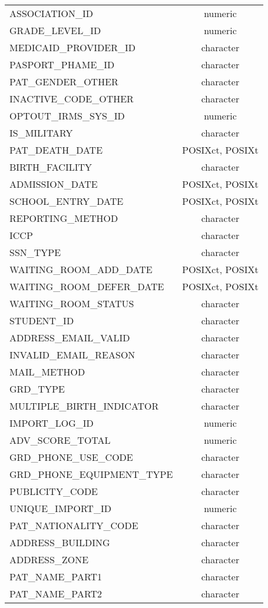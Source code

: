 \documentclass[
  letterpaper,
  DIV=11,
  numbers=noendperiod]{scrreprt}
\begin{document}
\begin{longtable}{lc}
ASSOCIATION\_ID & numeric \\ 
GRADE\_LEVEL\_ID & numeric \\ 
MEDICAID\_PROVIDER\_ID & character \\ 
PASPORT\_PHAME\_ID & character \\ 
PAT\_GENDER\_OTHER & character \\ 
INACTIVE\_CODE\_OTHER & character \\ 
OPTOUT\_IRMS\_SYS\_ID & numeric \\ 
IS\_MILITARY & character \\ 
PAT\_DEATH\_DATE & POSIXct, POSIXt \\ 
BIRTH\_FACILITY & character \\ 
ADMISSION\_DATE & POSIXct, POSIXt \\ 
SCHOOL\_ENTRY\_DATE & POSIXct, POSIXt \\ 
REPORTING\_METHOD & character \\ 
ICCP & character \\ 
SSN\_TYPE & character \\ 
WAITING\_ROOM\_ADD\_DATE & POSIXct, POSIXt \\ 
WAITING\_ROOM\_DEFER\_DATE & POSIXct, POSIXt \\ 
WAITING\_ROOM\_STATUS & character \\ 
STUDENT\_ID & character \\ 
ADDRESS\_EMAIL\_VALID & character \\ 
INVALID\_EMAIL\_REASON & character \\ 
MAIL\_METHOD & character \\ 
GRD\_TYPE & character \\ 
MULTIPLE\_BIRTH\_INDICATOR & character \\ 
IMPORT\_LOG\_ID & numeric \\ 
ADV\_SCORE\_TOTAL & numeric \\ 
GRD\_PHONE\_USE\_CODE & character \\ 
GRD\_PHONE\_EQUIPMENT\_TYPE & character \\ 
PUBLICITY\_CODE & character \\ 
UNIQUE\_IMPORT\_ID & numeric \\ 
PAT\_NATIONALITY\_CODE & character \\ 
ADDRESS\_BUILDING & character \\ 
ADDRESS\_ZONE & character \\ 
PAT\_NAME\_PART1 & character \\ 
PAT\_NAME\_PART2 & character \\ 

\end{longtable}
\end{document}
